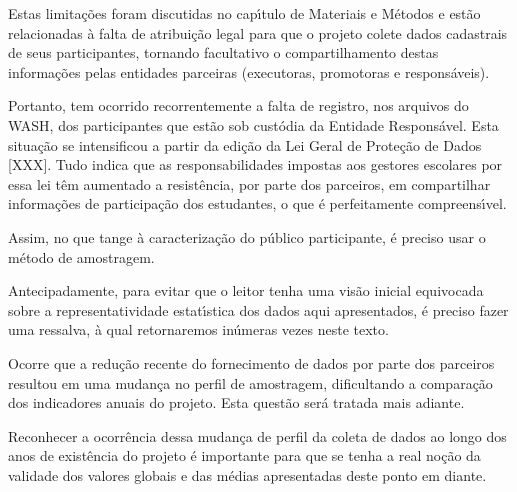 \documentclass[
12pt,		%
openright,	%
twoside,  %
a4paper,			%
chapter=TITLE,		%
english,			%
french,				%
spanish,			%
brazil				%
]{USPSC-classe/USPSC}
\begin{document}
Estas limita\c{c}\~oes foram discutidas no cap\'{\i}tulo de Materiais e M\'etodos e est\~ao relacionadas \`a falta de atribui\c{c}\~ao legal para que o projeto colete dados cadastrais de seus participantes, tornando facultativo o compartilhamento destas informa\c{c}\~oes pelas entidades parceiras (executoras, promotoras e respons\'aveis).










Portanto, tem ocorrido recorrentemente a falta de registro, nos arquivos do WASH, dos participantes que est\~ao sob cust\'odia da Entidade Respons\'avel. Esta situa\c{c}\~ao se intensificou a partir da edi\c{c}\~ao da Lei Geral de Prote\c{c}\~ao de Dados [XXX]. Tudo indica que as responsabilidades impostas aos gestores escolares por essa lei t\^em aumentado a  resist\^encia, por parte dos parceiros, em compartilhar informa\c{c}\~oes de participa\c{c}\~ao dos estudantes, o que \'e perfeitamente compreens\'{\i}vel.










Assim, no que tange \`a caracteriza\c{c}\~ao do p\'ublico participante, \'e preciso usar o m\'etodo de amostragem.










Antecipadamente, para evitar que o leitor tenha uma vis\~ao inicial equivocada sobre a representatividade estat\'{\i}stica dos dados aqui apresentados, \'e preciso fazer uma ressalva, \`a qual retornaremos in\'umeras vezes neste texto.










Ocorre que a redu\c{c}\~ao recente do fornecimento de dados por parte dos parceiros resultou em uma mudan\c{c}a no perfil de amostragem, dificultando a compara\c{c}\~ao dos indicadores anuais do projeto. Esta quest\~ao ser\'a tratada mais adiante.










Reconhecer a ocorr\^encia dessa mudan\c{c}a de perfil da coleta de dados ao longo dos anos de exist\^encia do projeto \'e importante para que se tenha a real no\c{c}\~ao da validade dos valores globais e das m\'edias apresentadas deste ponto em diante.
\end{document}
